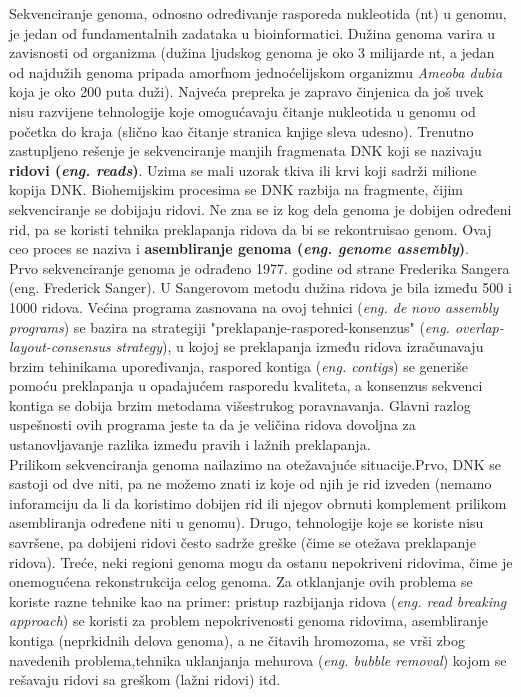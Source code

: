 \documentclass[a4paper]{article}
\begin{document}
{Sekvenciranje genoma, odnosno određivanje rasporeda nukleotida (nt) u genomu, je jedan od fundamentalnih zadataka u bioinformatici. Dužina genoma varira u zavisnosti od organizma (dužina ljudskog genoma je oko 3 milijarde nt, a jedan od najdužih genoma pripada amorfnom jednoćelijskom organizmu \textit{Ameoba dubia} koja je oko 200 puta duži). Najveća prepreka je zapravo činjenica da još uvek nisu razvijene tehnologije koje omogućavaju čitanje nukleotida u genomu od početka do kraja (slično kao čitanje stranica knjige sleva udesno). Trenutno zastupljeno rešenje je sekvenciranje manjih fragmenata DNK koji se nazivaju \textbf{ridovi (\textit{eng. reads})}. Uzima se mali uzorak tkiva ili krvi koji sadrži milione kopija DNK. Biohemijskim procesima se DNK razbija na fragmente, čijim sekvenciranje se dobijaju ridovi. Ne zna se iz kog dela genoma je dobijen određeni rid, pa se koristi tehnika preklapanja ridova da bi se rekontruisao genom. Ovaj ceo proces se naziva i \textbf{asembliranje genoma (\textit{eng. genome assembly})}. \\
\indent Prvo sekvenciranje genoma je odrađeno 1977. godine od strane Frederika Sangera (eng. Frederick Sanger). U Sangerovom metodu dužina ridova je bila između 500 i 1000 ridova. Većina programa zasnovana na ovoj tehnici (\textit{eng. de novo assembly programs}) se bazira na strategiji  "preklapanje-raspored-konsenzus" (\textit{eng. overlap-layout-consensus strategy}), u kojoj se preklapanja između ridova izračunavaju brzim tehinikama upore\-đivanja, raspored kontiga (\textit{eng. contigs}) se generiše pomoću preklapanja u opadajućem rasporedu kvaliteta, a konsenzus sekvenci kontiga se dobija brzim metodama višestrukog poravnavanja. Glavni razlog uspešnosti ovih programa jeste ta da je veličina ridova dovoljna za ustanovljavanje razlika između pravih i lažnih preklapanja. \\
\indent Prilikom sekvenciranja genoma nailazimo na otežavajuće situacije.Prvo, DNK se sastoji od dve niti, pa ne možemo znati iz koje od njih je rid izveden (nemamo inforamciju da li da koristimo dobijen rid ili njegov obrnuti komplement prilikom asembliranja određene niti u genomu). Drugo, tehnologije koje se koriste nisu savršene, pa dobijeni ridovi često sadrže greške (čime se otežava preklapanje ridova). Treće, neki regioni genoma mogu da ostanu nepokriveni ridovima, čime je onemogućena rekonstrukcija celog genoma. Za otklanjanje ovih problema se koriste razne tehnike kao na primer: pristup razbijanja ridova (\textit{eng. read breaking 
approach}) se koristi za problem nepokrivenosti genoma ridovima, asembliranje kontiga (neprkidnih delova genoma), a ne čitavih hromozoma, se vrši zbog navedenih problema,tehnika uklanjanja mehurova (\textit{eng. bubble removal}) kojom se rešavaju ridovi sa greškom (lažni ridovi) itd. \\
}
\end{document}
